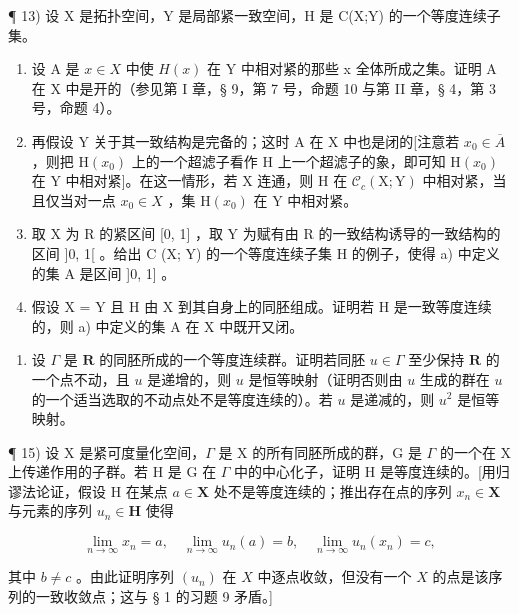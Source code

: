 ¶ 13) 设 X 是拓扑空间，Y 是局部紧一致空间，H 是 C(X;Y) 的一个等度连续子集。

\begin{enumerate}
\def\labelenumi{\alph{enumi})}
\item
  设 A 是 \(x \in X\) 中使 \(H(x)\) 在 Y 中相对紧的那些 x 全体所成之集。证明 A 在 X 中是开的（参见第 I 章，§ 9，第 7 号，命题 10 与第 II 章，§ 4，第 3 号，命题 4）。
\item
  再假设 Y 关于其一致结构是完备的；这时 A 在 X 中也是闭的{[}注意若 \(x_{0} \in \overline{A}\) ，则把 \(\mathrm{H}(x_{0})\) 上的一个超滤子看作 H 上一个超滤子的象，即可知 \(\mathrm{H}(x_{0})\) 在 Y 中相对紧{]}。在这一情形，若 X 连通，则 H 在 \(\mathcal{C}_{c}(\mathrm{X};\mathrm{Y})\) 中相对紧，当且仅当对一点 \(x_{0} \in X\) ，集 \(\mathrm{H}(x_{0})\) 在 Y 中相对紧。
\item
  取 X 为 R 的紧区间 {[}0, 1{]} ，取 Y 为赋有由 R 的一致结构诱导的一致结构的区间 {]}0, 1{[} 。给出 C (X; Y) 的一个等度连续子集 H 的例子，使得 a) 中定义的集 A 是区间 {]}0, 1{]} 。
\item
  假设 X = Y 且 H 由 X 到其自身上的同胚组成。证明若 H 是一致等度连续的，则 a) 中定义的集 A 在 X 中既开又闭。
\end{enumerate}

\begin{enumerate}
\def\labelenumi{\arabic{enumi})}
\setcounter{enumi}{13}
\tightlist
\item
  设 \(\Gamma\) 是 \(\mathbf{R}\) 的同胚所成的一个等度连续群。证明若同胚 \(u \in \Gamma\) 至少保持 \(\mathbf{R}\) 的一个点不动，且 \(u\) 是递增的，则 \(u\) 是恒等映射（证明否则由 \(u\) 生成的群在 \(u\) 的一个适当选取的不动点处不是等度连续的）。若 \(u\) 是递减的，则 \(u^2\) 是恒等映射。
\end{enumerate}

¶ 15) 设 X 是紧可度量化空间，\(\Gamma\) 是 X 的所有同胚所成的群，G 是 \(\Gamma\) 的一个在 X 上传递作用的子群。若 H 是 G 在 \(\Gamma\) 中的中心化子，证明 H 是等度连续的。{[}用归谬法论证，假设 H 在某点 \(a \in \mathbf{X}\) 处不是等度连续的；推出存在点的序列 \(x_n \in \mathbf{X}\) 与元素的序列 \(u_n \in \mathbf{H}\) 使得

\[
\lim _ {n \rightarrow \infty} x _ {n} = a, \quad \lim _ {n \rightarrow \infty} u _ {n} (a) = b, \quad \lim _ {n \rightarrow \infty} u _ {n} (x _ {n}) = c,
\]

其中 \(b \neq c\) 。由此证明序列 \((u_n)\) 在 \(X\) 中逐点收敛，但没有一个 \(X\) 的点是该序列的一致收敛点；这与 § 1 的习题 9 矛盾。{]}


